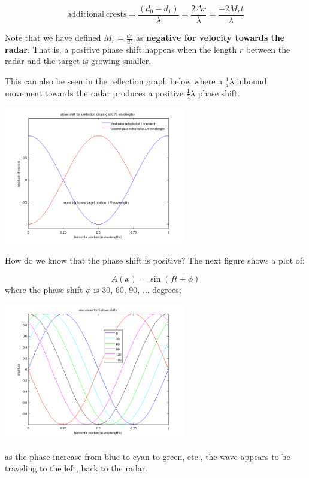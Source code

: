 \documentclass[12pt]{article}
\begin{document}
\begin{itemize}
\begin{equation}
  \label{eq:rip4}
  \mathrm{additional\ crests}=\frac{(d_0 - d_1) }{\lambda}
  =\frac{2 \Delta r }{\lambda} =  \frac{-2 M_r t }{\lambda}
\end{equation}

Note that we have defined $M_r = \frac{dr}{dt}$ as \textbf{negative for velocity towards the radar}.
That is, a positive phase shift happens when the length $r$ between the radar and the target
is growing smaller.

This can also be seen in the reflection graph below
where a $\frac{1 }{4}\lambda$ inbound movement
towards the radar produces a positive $\frac{1 }{2}\lambda$ phase shift. 

\includegraphics[width=0.6\textwidth]{figures_tex/reflection.png}


How do we know that the phase shift is positive?  The next figure
 shows a plot of:

\begin{equation*}
  A(x) = \sin(ft + \phi)
\end{equation*}
where the phase shift $\phi$ is 30, 60, 90, $\ldots$ degrees;

\includegraphics[width=0.6\textwidth]{figures_tex/sine_waves.png}

as the phase increase from blue to cyan to green, etc., the
wave appears to be traveling to the left, back to the radar.


\end{itemize}
\end{document}
